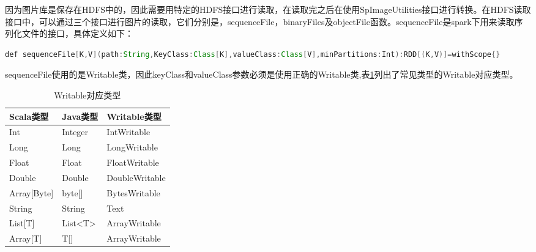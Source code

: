 因为图片库是保存在HDFS中的，因此需要用特定的HDFS接口进行读取，在读取完之后在使用SpImageUtilities接口进行转换。在HDFS读取接口中，可以通过三个接口进行图片的读取，它们分别是，sequenceFile，binaryFiles及objectFile函数。sequenceFile是spark下用来读取序列化文件的接口，具体定义如下：
\begin{lstlisting}[language=Java,numbers=none,frame=none]
def sequenceFile[K,V](path:String,KeyClass:Class[K],valueClass:Class[V],minPartitions:Int):RDD[(K,V)]=withScope{}
\end{lstlisting}
sequenceFile使用的是Writable类，因此keyClass和valueClass参数必须是使用正确的Writable类,表\ref{tab:Writable}列出了常见类型的Writable对应类型。
\begin{table}[h] %
\caption{Writable对应类型} %
\centering
\label{tab:Writable}
\begin{tabular}{p{4cm}|p{2cm}|p{6cm}} %
\hline
\hline
Scala类型  & Java类型 & Writable类型 \\ %
\hline %
Int  & Integer & IntWritable\\
\hline
Long  & Long & LongWritable\\
\hline
Float  & Float & FloatWritable\\
\hline
Double  & Double & DoubleWritable\\
\hline
Array[Byte]  & byte[] & BytesWritable\\
\hline
String  & String & Text\\
\hline
List[T] & List<T> & ArrayWritable\\
\hline
Array[T] & T[] & ArrayWritable\\
\hline
\hline
\end{tabular}
\end{table}

